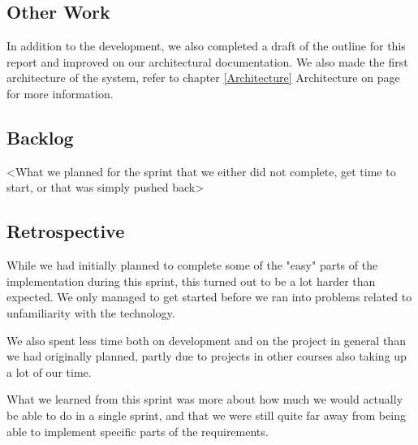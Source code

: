 \subsection{Other Work}
In addition to the development, we also completed a draft of the outline for this report and improved on our architectural documentation.
We also made the first architecture of the system, refer to chapter \ref{Architecture} Architecture on page \pageref{Architecture} for more information.

\subsection{Backlog}
<What we planned for the sprint that we either did not complete, get time to start, or that was simply pushed back>

\subsection{Retrospective}
While we had initially planned to complete some of the "easy" parts of the implementation during this sprint, this turned out to be a lot harder than expected. We only managed to get started before we ran into problems related to unfamiliarity with the technology.

We also spent less time both on development and on the project in general than we had originally planned, partly due to projects in other courses also taking up a lot of our time.

What we learned from this sprint was more about how much we would actually be able to do in a single sprint, and that we were still quite far away from being able to implement specific parts of the requirements.
